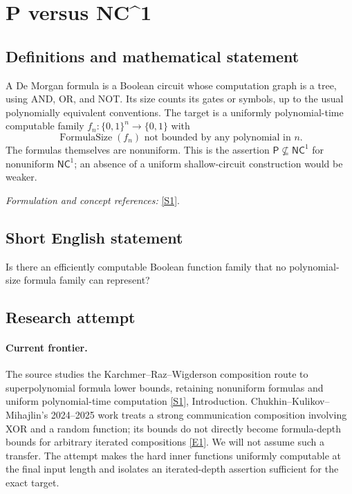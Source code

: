\documentclass[11pt,a4paper]{article}
\newcommand{\sref}[2]{\hyperlink{source:#1:#2}{[S#2]}}
\newcommand{\eref}[2]{\hyperlink{extra:#1:#2}{[E#2]}}
\newif\ifshowcatalogue
\newcommand{\cataloguescope}[1]{\ifshowcatalogue
 \paragraph{Exact scope in the supplied catalogue.}
 \begin{quote}\small #1\end{quote}\fi}
\numberwithin{equation}{section}
\begin{document}
\setcounter{section}{0}
\clearpage
\section*{\texorpdfstring{P versus NC\textasciicircum{}1}{P versus NC\textasciicircum{}1}}\label{statement}
\subsection{Definitions and mathematical statement}
A De Morgan formula is a Boolean circuit whose computation graph is a tree, using AND, OR, and NOT. Its size counts its gates or symbols, up to the usual polynomially equivalent conventions. The target is a uniformly polynomial-time computable family $f_n:\{0,1\}^n\to\{0,1\}$ with
\[
 \operatorname{FormulaSize}(f_n)\text{ not bounded by any polynomial in }n.
\]
The formulas themselves are nonuniform. This is the assertion $\mathsf P\nsubseteq\mathsf{NC}^1$ for nonuniform $\mathsf{NC}^1$; an absence of a uniform shallow-circuit construction would be weaker.
\par\smallskip\textit{Formulation and concept references:} \sref{statement}{1}.
\cataloguescope{Exhibit a Boolean function family computable in deterministic polynomial time whose nonuniform De Morgan formula size is superpolynomial; equivalently, prove that P is not contained in nonuniform NC\textasciicircum{}1.}
\subsection{Short English statement}
Is there an efficiently computable Boolean function family that no polynomial-size formula family can represent?
\subsection{Research attempt}

\paragraph{Current frontier.}
The source studies the Karchmer--Raz--Wigderson composition route to superpolynomial formula lower bounds, retaining nonuniform formulas and uniform polynomial-time computation \sref{statement}{1}, Introduction. Chukhin--Kulikov--Mihajlin's 2024--2025 work treats a strong communication composition involving XOR and a random function; its bounds do not directly become formula-depth bounds for arbitrary iterated compositions \eref{statement}{1}. We will not assume such a transfer. The attempt makes the hard inner functions uniformly computable at the final input length and isolates an iterated-depth assertion sufficient for the exact target.
\end{document}

